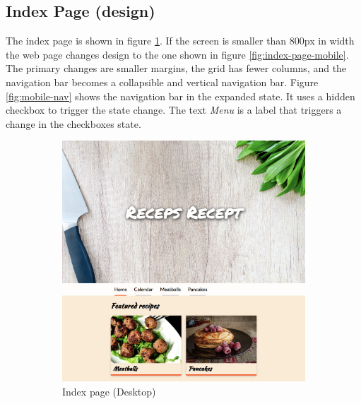 \documentclass[a4paper]{scrartcl}
\begin{document}
\subsection{Index Page (design)}

The index page is shown in figure \ref{fig:index-page}. If the screen is smaller than 800px in width the web page changes design to the one shown in figure \ref{fig:index-page-mobile}. The primary changes are smaller margins, the grid has fewer columns, and the navigation bar becomes a collapsible and vertical navigation bar. Figure \ref{fig:mobile-nav} shows the navigation bar in the expanded state. It uses a hidden checkbox to trigger the state change. The text \textit{Menu} is a label that triggers a change in the checkboxes state.

\begin{figure}
	\centering
	\begin{subfigure}[b]{0.7\linewidth}
		\includegraphics[width=\linewidth]{images/screenshot-index.jpg}
		\caption{Index page (Desktop)}
		\label{fig:index-page}
	\end{subfigure}
	\begin{subfigure}[b]{0.2\linewidth}

\end{subfigure}
\end{figure}
\end{document}
